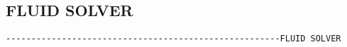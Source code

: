 \subsection{FLUID SOLVER}
\begin{verbatim}
------------------------------------------------------FLUID SOLVER
\end{verbatim}

